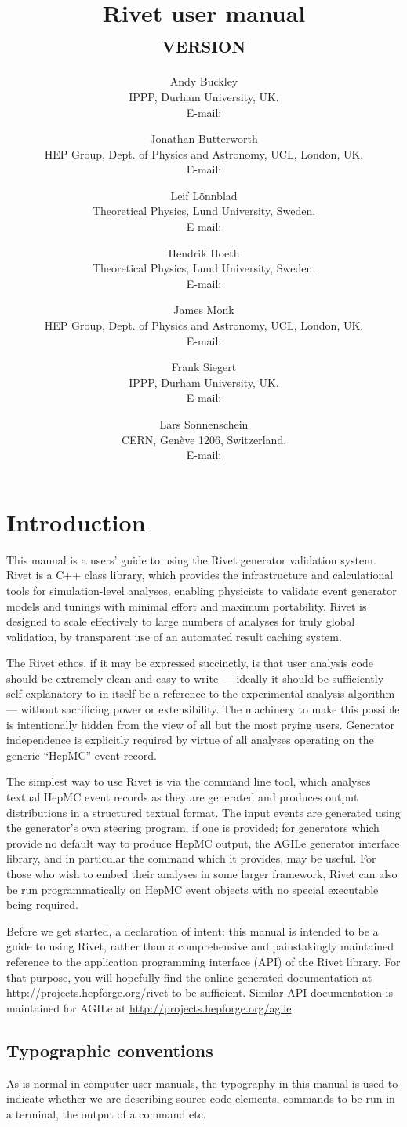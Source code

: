 \documentclass{JHEP3}
\title{Rivet user manual\\ {\smaller \textsc{version \RivetVersion}}}
\author{Andy Buckley\\ IPPP, Durham University, UK.\\ E-mail: \email{andy.buckley@durham.ac.uk}}
\author{Jonathan Butterworth\\ HEP Group, Dept. of Physics and Astronomy, UCL, London, UK.\\ E-mail: \email{J.Butterworth@ucl.ac.uk}}
\author{Leif L\"onnblad\\ Theoretical Physics, Lund University, Sweden.\\ E-mail: \email{lonnblad@thep.lu.se}}
\author{Hendrik Hoeth\\ Theoretical Physics, Lund University, Sweden.\\ E-mail: \email{hendrik.hoeth@cern.ch}}
\author{James Monk\\ HEP Group, Dept. of Physics and Astronomy, UCL, London, UK.\\ E-mail: \email{jmonk@hep.ucl.ac.uk}}
\author{Frank Siegert\\ IPPP, Durham University, UK.\\ E-mail: \email{frank.siegert@durham.ac.uk}}
\author{Lars Sonnenschein\\ CERN, Gen\`eve 1206, Switzerland.\\ E-mail: \email{sonne@cern.ch}}
\begin{document}
 


\section{Introduction}

This manual is a users' guide to using the Rivet generator validation
system. Rivet is a C++ class library, which provides the infrastructure and
calculational tools for simulation-level analyses, enabling physicists to
validate event generator models and tunings with minimal effort and maximum
portability. Rivet is designed to scale effectively to large numbers of analyses
for truly global validation, by transparent use of an automated result caching
system.

The Rivet ethos, if it may be expressed succinctly, is that user analysis code
should be extremely clean and easy to write --- ideally it should be
sufficiently self-explanatory to in itself be a reference to the experimental
analysis algorithm --- without sacrificing power or extensibility. The machinery
to make this possible is intentionally hidden from the view of all but the most
prying users. Generator independence is explicitly required by virtue of all
analyses operating on the generic ``HepMC'' event record.

The simplest way to use Rivet is via the  command line tool, which
analyses textual HepMC event records as they are generated and produces output
distributions in a structured textual format. The input events are generated
using the generator's own steering program, if one is provided; for generators
which provide no default way to produce HepMC output, the AGILe generator
interface library, and in particular the  command which it
provides, may be useful. For those who wish to embed their analyses in some
larger framework, Rivet can also be run programmatically on HepMC event objects
with no special executable being required.

Before we get started, a declaration of intent: this manual is intended to be a
guide to using Rivet, rather than a comprehensive and painstakingly maintained
reference to the application programming interface (API) of the Rivet
library. For that purpose, you will hopefully find the online generated
documentation at \url{http://projects.hepforge.org/rivet} to be
sufficient. Similar API documentation is maintained for AGILe at
\url{http://projects.hepforge.org/agile}.


\subsection{Typographic conventions}
As is normal in computer user manuals, the typography in this manual is used to
indicate whether we are describing source code elements, commands to be run in a
terminal, the output of a command etc.
\end{document}
